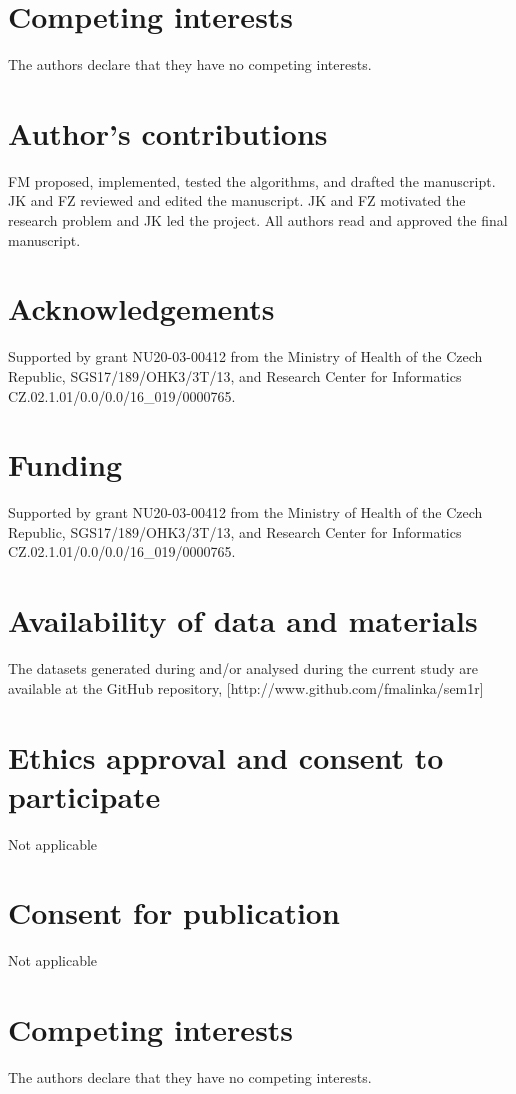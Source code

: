 \documentclass{bmcart}
\begin{document}
\begin{backmatter}

\section*{Competing interests}
The authors declare that they have no competing interests.

\section*{Author's contributions}
FM proposed, implemented, tested the algorithms, and drafted the manuscript. JK and FZ reviewed and edited the manuscript. JK and FZ motivated the research problem and JK led the project. All authors read and approved the final manuscript.

\section*{Acknowledgements}
Supported by grant NU20-03-00412 from the Ministry of Health of the Czech Republic, SGS17/189/OHK3/3T/13, and Research Center for Informatics CZ.02.1.01/0.0/0.0/16\_019/0000765.
 
 \section*{Funding}
Supported by grant NU20-03-00412 from the Ministry of Health of the Czech Republic, SGS17/189/OHK3/3T/13, and Research Center for Informatics CZ.02.1.01/0.0/0.0/16\_019/0000765.

 \section*{Availability of data and materials}
The datasets generated during and/or analysed during the current study are available at the GitHub repository, [http://www.github.com/fmalinka/sem1r]

 \section*{Ethics approval and consent to participate}
Not applicable

 \section*{Consent for publication}
Not applicable

 \section*{Competing interests}
The authors declare that they have no competing interests.


\end{backmatter}
\end{document}
